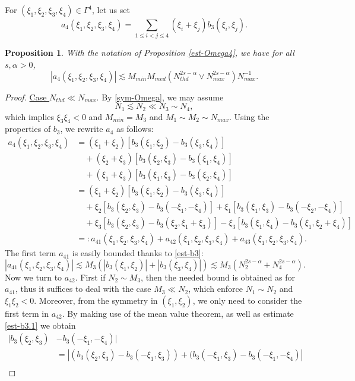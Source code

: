 \documentclass{amsart}
\newtheorem{proposition}[theorem]{Proposition}
\theoremstyle{definition}
\theoremstyle{remark}
\numberwithin{equation}{section}
\begin{document}
For $(\xi_1,\xi_2,\xi_3,\xi_4) \in \Gamma^4$, let us set
$$
a_4(\xi_1,\xi_2,\xi_3,\xi_4) = \sum_{1 \le i<j \le 4}(\xi_i+\xi_j)b_3(\xi_i,\xi_j).
$$
\begin{proposition}\label{est-a4.0}
 With the notation of Proposition \ref{est-Omega4}, we have for all $s,\alpha>0$,
 \begin{equation}\label{est-a4.1}
  |a_4(\xi_1,\xi_2,\xi_3,\xi_4)| \lesssim M_{min} M_{med}(N_{thd}^{2s-\alpha}\vee N_{max}^{2s-\alpha}) N_{max}^{-1}.
 \end{equation}
\end{proposition}
\begin{proof}
  \noindent
  \underline{Case $N_{thd} \ll N_{max}$}.
  By \eqref{sym-Omega}, we may assume
  $$
  N_1\lesssim N_2 \ll N_3\sim N_4,
  $$
  which implies $\xi_3\xi_4 < 0$ and $M_{min}=M_3$ and $M_1\sim M_2\sim N_{max}$. Using the properties of $b_3$, we rewrite $a_4$ as follows:
  \begin{align*}
   a_4(\xi_1,\xi_2,\xi_3,\xi_4) &= (\xi_1+\xi_2)[b_3(\xi_1,\xi_2) - b_3(\xi_3,\xi_4)]\\
   &\quad + (\xi_2+\xi_3)[b_3(\xi_2,\xi_3) - b_3(\xi_1,\xi_4)] \\
   &\quad + (\xi_1+\xi_3)[b_3(\xi_1,\xi_3) - b_3(\xi_2,\xi_4)] \\
   &= (\xi_1+\xi_2)[b_3(\xi_1,\xi_2) - b_3(\xi_3,\xi_4)] \\
   &\quad + \xi_2[b_3(\xi_2,\xi_3)-b_3(-\xi_1,-\xi_4)] + \xi_1[b_3(\xi_1,\xi_3)-b_3(-\xi_2,-\xi_4)]\\
   &\quad + \xi_3[b_3(\xi_2,\xi_3)-b_3(\xi_2,\xi_1+\xi_3)] - \xi_3[b_3(\xi_1,\xi_4)-b_3(\xi_1,\xi_2+\xi_4)]\\
   & =: a_{41}(\xi_1,\xi_2,\xi_3,\xi_4) +a_{42}(\xi_1,\xi_2,\xi_3,\xi_4) +a_{43}(\xi_1,\xi_2,\xi_3,\xi_4).
  \end{align*}
    The first term $a_{41}$ is easily bounded thanks to \eqref{est-b3}:
    $$
    |a_{41}(\xi_1,\xi_2,\xi_3,\xi_4)| \lesssim M_3 (|b_3(\xi_1,\xi_2)| + |b_3(\xi_3,\xi_4)|)\lesssim M_3(N_2^{2s-\alpha} + N_4^{2s-\alpha}).
    $$
    Now we turn to $a_{42}$. First if $N_2\sim M_3$, then the needed bound is obtained as for $a_{41}$, thus it suffices to deal with the case $M_3\ll N_2$, which enforce $N_1\sim N_2$ and $\xi_1\xi_2<0$. Moreover, from the symmetry in $(\xi_1, \xi_2)$, we only need to consider the first term in $a_{42}$. By making use of the mean value theorem, as well as estimate \eqref{est-b3.1} we obtain
    \begin{align*}
      |b_3(\xi_2,\xi_3)& - b_3(-\xi_1,-\xi_4)| \\ &= |(b_3(\xi_2,\xi_3) - b_3(-\xi_1,\xi_3)) + (b_3(-\xi_1,\xi_3) - b_3(-\xi_1,-\xi_4)|\\

\end{align*}
\end{proof}
\end{document}
